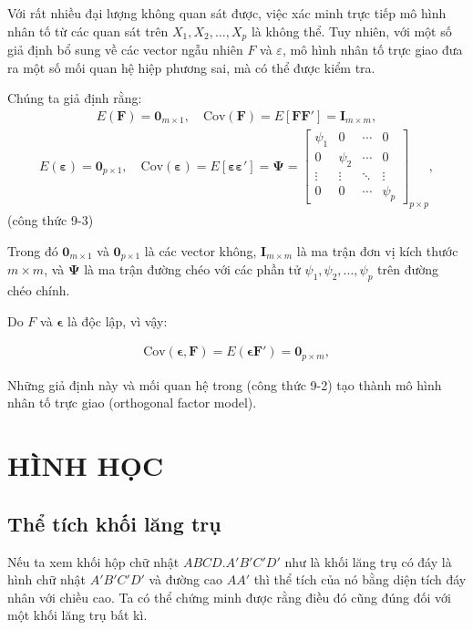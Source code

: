\documentclass[a4paper]{book}
\begin{document}
Với rất nhiều đại lượng không quan sát được, việc xác minh trực tiếp mô hình nhân tố từ các quan sát trên \(X_1, X_2, \ldots, X_p\) là không thể. Tuy nhiên, với một số giả định bổ sung về các vector ngẫu nhiên \(F\) và \(\varepsilon\), mô hình nhân tố trực giao đưa ra một số mối quan hệ hiệp phương sai, mà có thể được kiểm tra.

Chúng ta giả định rằng:
\begin{eqnarray}
E(\mathbf{F}) = \mathbf{0}_{m \times 1}, \quad \text{Cov}(\mathbf{F}) = E[\mathbf{FF}'] = \mathbf{I}_{m \times m},
\end{eqnarray}
\begin{eqnarray}
E(\boldsymbol{\varepsilon}) = \mathbf{0}_{p \times 1}, \quad \text{Cov}(\boldsymbol{\varepsilon}) = E[\boldsymbol{\varepsilon} \boldsymbol{\varepsilon}'] = \boldsymbol{\Psi} =
\begin{bmatrix}
\psi_1 & 0 & \cdots & 0 \\
0 & \psi_2 & \cdots & 0 \\
\vdots & \vdots & \ddots & \vdots \\
0 & 0 & \cdots & \psi_p
\end{bmatrix}_{p \times p},
\end{eqnarray}
(công thức 9-3)

Trong đó \(\mathbf{0}_{m \times 1}\) và \(\mathbf{0}_{p \times 1}\) là các vector không, \(\mathbf{I}_{m \times m}\) là ma trận đơn vị kích thước \(m \times m\), và \(\boldsymbol{\Psi}\) là ma trận đường chéo với các phần tử \(\psi_1, \psi_2, \ldots, \psi_p\) trên đường chéo chính.

Do \(F\) và \(\boldsymbol{\epsilon}\) là độc lập, vì vậy:

\begin{eqnarray}
\text{Cov}(\boldsymbol{\epsilon}, \mathbf{F}) = E(\boldsymbol{\epsilon}\mathbf{F}') = \mathbf{0}_{p \times m},
\end{eqnarray}

Những giả định này và mối quan hệ trong (công thức 9-2) tạo thành mô hình nhân tố trực giao (orthogonal factor model).



\chapter{HÌNH HỌC}
\section{Thể tích khối lăng trụ}
Nếu ta xem khối hộp chữ nhật $ABCD.A'B'C'D'$ như là khối lăng trụ có đáy là hình chữ nhật $A'B'C'D'$ và đường cao $AA'$ thì thể tích của nó bằng diện tích đáy nhân với chiều cao. Ta có thể chứng minh được rằng điều đó cũng đúng đối với một khối lăng trụ bất kì.
\end{document}
